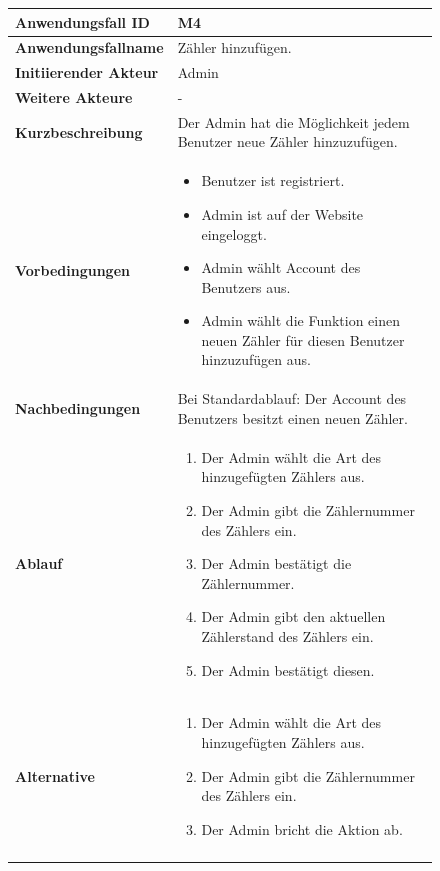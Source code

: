 \newpage

\begin{figure}[h]
	\centering
	\begin{tabularx}{\textwidth}{ X | X }

		\textbf{Anwendungsfall ID} & M4 \\ \hline
		\textbf{Anwendungsfallname} & Zähler hinzufügen. \\ \hline
		\textbf{Initiierender Akteur} & Admin \\ \hline
		\textbf{Weitere Akteure} & - \\ \hline
		\textbf{Kurzbeschreibung} & Der Admin hat die Möglichkeit jedem Benutzer neue Zähler hinzuzufügen.   \\ \hline
		\textbf{Vorbedingungen} & 
		\begin {itemize}
			\item Benutzer ist registriert. 
			\item Admin ist auf der Website eingeloggt.
			\item Admin wählt Account des Benutzers aus.
			\item Admin wählt die Funktion einen neuen Zähler für diesen Benutzer hinzuzufügen aus.
		\end{itemize}\\ \hline
		\textbf{Nachbedingungen} & Bei Standardablauf: Der Account des Benutzers besitzt einen neuen Zähler. \\ \hline
		\textbf{Ablauf} &
		\begin{enumerate}
			\item Der Admin wählt die Art des hinzugefügten Zählers aus.
			\item Der Admin gibt die Zählernummer des Zählers ein.
			\item Der Admin bestätigt die Zählernummer.
			\item Der Admin gibt den aktuellen Zählerstand des Zählers ein.
			\item Der Admin bestätigt diesen.
		\end{enumerate} \\ \hline
		\textbf{Alternative} & 
		\begin{enumerate}
			\item Der Admin wählt die Art des hinzugefügten Zählers aus.
			\item Der Admin gibt die Zählernummer des Zählers ein.
			\item Der Admin bricht die Aktion ab.
		\end{enumerate} \\ &
	\end{tabularx}
\end{figure}

